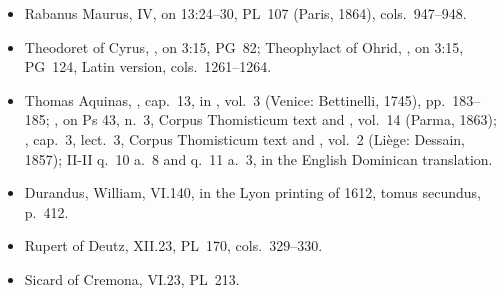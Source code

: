 {\begin{itemize}[leftmargin=1.2em,itemsep=.15em]
1845), cols.~93--94;  V, on 29:5--14, PL~24 (Paris, 1865),
cols.~891--893.
\item Rabanus Maurus,  IV, on 13:24--30, PL~107
(Paris, 1864), cols.~947--948.
\item Theodoret of Cyrus, , on
3:15, PG~82; Theophylact of Ohrid, , on 3:15, PG~124, Latin version, cols.~1261--1264.
\item Thomas Aquinas, , cap.~13, in
, vol.~3 (Venice: Bettinelli, 1745), pp.~183--185;
, on Ps 43, n.~3, Corpus Thomisticum text and
, vol.~14 (Parma, 1863); , cap.~3, lect.~3, Corpus Thomisticum text and , vol.~2 (Liège: Dessain, 1857);
 II-II q.~10 a.~8 and q.~11 a.~3, in the English
Dominican translation.
\item Durandus, William,  VI.140, in the
Lyon printing of 1612, tomus secundus, p.~412.
\item Rupert of Deutz,  XII.23, PL~170,
cols.~329--330.
\item Sicard of Cremona,  VI.23, PL~213.
\end{itemize}
\par}
